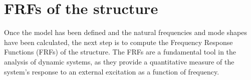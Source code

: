 \section{FRFs of the structure}
\label{sec:FRFs}

Once the model has been defined and the natural frequencies and mode shapes have been calculated, the next step is to compute the Frequency Response Functions (FRFs) of the structure.
The FRFs are a fundamental tool in the analysis of dynamic systems, as they provide a quantitative measure of the system's response to an external excitation as a function of frequency.


